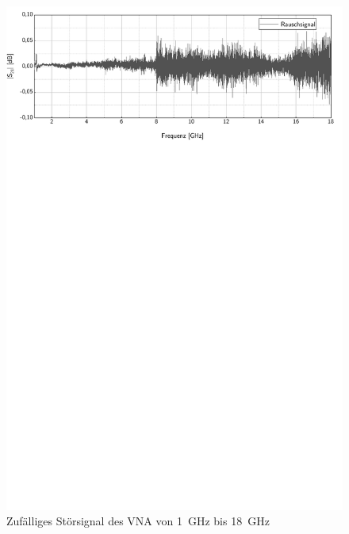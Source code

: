 \begin{figure}[ht]
    \centering
    \includegraphics[page = 1, width = .99\textwidth, trim = 0cm 18.1cm 0.3cm 0cm, clip]{Abbildungen/Kapitel4/Rauschsignal.pdf}
    \caption{Zufälliges Störsignal des VNA von \SI{1}{\giga\hertz} bis \SI{18}{\giga\hertz}}
    \label{fig:4_Stoersignal}
\end{figure}


